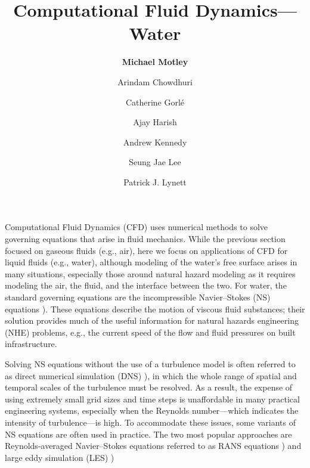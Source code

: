 %
%
%


\title{Computational Fluid Dynamics---Water}
\author{
    \textbf{Michael Motley}
    \and Arindam Chowdhuri
    \and Catherine Gorlé
    \and Ajay Harish
    \and Andrew Kennedy
    \and Seung Jae Lee
    \and Patrick J. Lynett}
\tocauthor{}
%
%
\maketitle

Computational Fluid Dynamics (CFD) uses numerical methods to solve governing equations that arise in fluid mechanics. While the previous section focused on gaseous fluids (e.g., air), here we focus on applications of CFD for liquid fluids (e.g., water), although modeling of the water's free surface arises in many situations, especially those around natural hazard modeling as it requires modeling the air, the fluid, and the interface between the two. For water, the standard governing equations are the incompressible Navier--Stokes (NS) equations \citep{Darrigol2005navier}). These equations describe the motion of viscous fluid substances; their solution provides much of the useful information for natural hazards engineering (NHE) problems, e.g., the current speed of the flow and fluid pressures on built infrastructure.

Solving NS equations without the use of a turbulence model is often referred to as direct numerical simulation (DNS)   \cite{Orszag1970DNS}), in which the whole range of spatial and temporal scales of the turbulence must be resolved. As a result, the expense of using extremely small grid sizes and time steps is unaffordable in many practical engineering systems, especially when the Reynolds number---which indicates the intensity of turbulence---is high. To accommodate these issues, some variants of NS equations are often used in practice. The two most popular approaches are Reynolds-averaged Navier--Stokes equations referred to as RANS equations  \cite{Reynolds1895RANS, Chou1945RANS}) and large eddy simulation (LES)  \cite{Deardorff1970LES})

